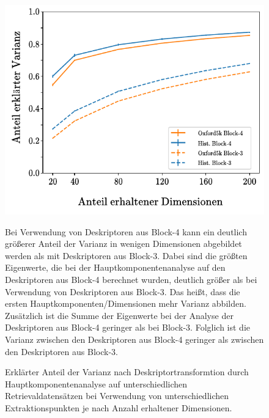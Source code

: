 \begin{figure}[h]
\begin{center}


\includegraphics[scale=1.3]{NNOPT/Anhang/explained_variance_layer4}
\caption{Erklärter Anteil der Varianz nach Deskriptortransformtion durch Hauptkomponentenanalyse auf unterschiedlichen Retrievaldatensätzen bei Verwendung von unterschiedlichen Extraktionspunkten je nach Anzahl erhaltener Dimensionen. }
\label{hyperopt_layer4_3}
\end{center}

Bei Verwendung von Deskriptoren aus Block-4 kann ein deutlich größerer Anteil der Varianz in wenigen Dimensionen abgebildet werden als mit Deskriptoren aus Block-3. Dabei sind die größten Eigenwerte, die bei der Hauptkomponentenanalyse auf den Deskriptoren aus Block-4 berechnet wurden, deutlich größer als bei Verwendung von Deskriptoren aus Block-3. Das heißt, dass die ersten Hauptkomponenten/Dimensionen mehr Varianz abbilden. Zusätzlich ist die Summe der Eigenwerte bei der Analyse der Deskriptoren aus Block-4 geringer als bei Block-3. Folglich ist die Varianz zwischen den Deskriptoren aus Block-4 geringer als zwischen den Deskriptoren aus Block-3.
\end{figure}

